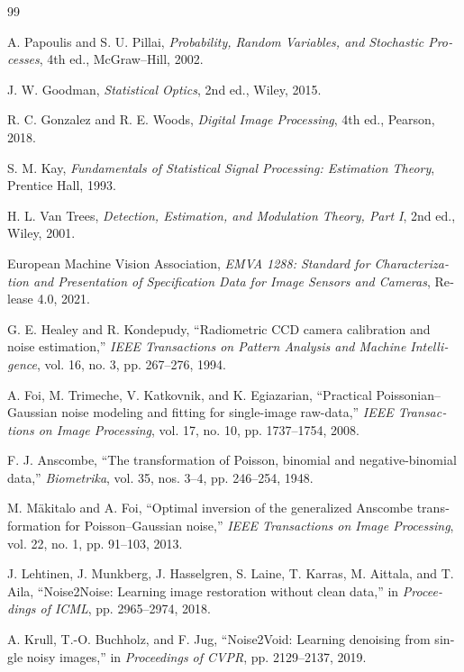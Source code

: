 \documentclass[12pt,openany,oneside]{book}
\begin{document}
\begin{latin}
\begin{thebibliography}{99}

A. Papoulis and S. U. Pillai,
\textit{Probability, Random Variables, and Stochastic Processes},
4th ed., McGraw--Hill, 2002.

J. W. Goodman,
\textit{Statistical Optics},
2nd ed., Wiley, 2015.

R. C. Gonzalez and R. E. Woods,
\textit{Digital Image Processing},
4th ed., Pearson, 2018.

S. M. Kay,
\textit{Fundamentals of Statistical Signal Processing: Estimation Theory},
Prentice Hall, 1993.

H. L. Van Trees,
\textit{Detection, Estimation, and Modulation Theory, Part I},
2nd ed., Wiley, 2001.

European Machine Vision Association,
\textit{EMVA 1288: Standard for Characterization and Presentation of Specification Data for Image Sensors and Cameras},
Release 4.0, 2021.

G. E. Healey and R. Kondepudy,
``Radiometric CCD camera calibration and noise estimation,''
\textit{IEEE Transactions on Pattern Analysis and Machine Intelligence},
vol. 16, no. 3, pp. 267--276, 1994.

A. Foi, M. Trimeche, V. Katkovnik, and K. Egiazarian,
``Practical Poissonian--Gaussian noise modeling and fitting for single-image raw-data,''
\textit{IEEE Transactions on Image Processing},
vol. 17, no. 10, pp. 1737--1754, 2008.

F. J. Anscombe,
``The transformation of Poisson, binomial and negative-binomial data,''
\textit{Biometrika}, vol. 35, nos. 3--4, pp. 246--254, 1948.

M. Mäkitalo and A. Foi,
``Optimal inversion of the generalized Anscombe transformation for Poisson--Gaussian noise,''
\textit{IEEE Transactions on Image Processing},
vol. 22, no. 1, pp. 91--103, 2013.

J. Lehtinen, J. Munkberg, J. Hasselgren, S. Laine, T. Karras, M. Aittala, and T. Aila,
``Noise2Noise: Learning image restoration without clean data,''
in \textit{Proceedings of ICML}, pp. 2965--2974, 2018.

A. Krull, T.-O. Buchholz, and F. Jug,
``Noise2Void: Learning denoising from single noisy images,''
in \textit{Proceedings of CVPR}, pp. 2129--2137, 2019.


\end{thebibliography}
\end{latin}
\end{document}
